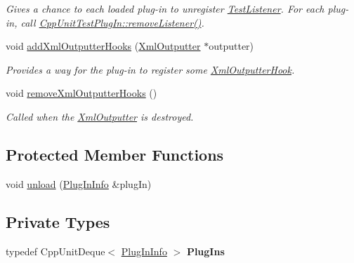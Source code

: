 \begin{DoxyCompactItemize}
\begin{DoxyCompactList}\small\item\em Gives a chance to each loaded plug-\/in to unregister \hyperlink{class_test_listener}{Test\+Listener}. For each plug-\/in, call \hyperlink{struct_cpp_unit_test_plug_in_a8f36157014b515d38efbc8ab67923d85}{Cpp\+Unit\+Test\+Plug\+In\+::remove\+Listener()}. \end{DoxyCompactList}\item 
void \hyperlink{class_plug_in_manager_a4a9c64e0ac3f762b100b993d7e33f889}{add\+Xml\+Outputter\+Hooks} (\hyperlink{class_xml_outputter}{Xml\+Outputter} $\ast$outputter)\hypertarget{class_plug_in_manager_a4a9c64e0ac3f762b100b993d7e33f889}{}\label{class_plug_in_manager_a4a9c64e0ac3f762b100b993d7e33f889}

\begin{DoxyCompactList}\small\item\em Provides a way for the plug-\/in to register some \hyperlink{class_xml_outputter_hook}{Xml\+Outputter\+Hook}. \end{DoxyCompactList}\item 
void \hyperlink{class_plug_in_manager_a0fe59f82fd430ea57159a6ffad9a4035}{remove\+Xml\+Outputter\+Hooks} ()
\begin{DoxyCompactList}\small\item\em Called when the \hyperlink{class_xml_outputter}{Xml\+Outputter} is destroyed. \end{DoxyCompactList}\end{DoxyCompactItemize}
\subsection*{Protected Member Functions}
\begin{DoxyCompactItemize}
\item 
void \hyperlink{class_plug_in_manager_afc1fa045afaac73cd44f69839056f1e1}{unload} (\hyperlink{struct_plug_in_manager_1_1_plug_in_info}{Plug\+In\+Info} \&plug\+In)
\end{DoxyCompactItemize}
\subsection*{Private Types}
\begin{DoxyCompactItemize}
\item 
typedef Cpp\+Unit\+Deque$<$ \hyperlink{struct_plug_in_manager_1_1_plug_in_info}{Plug\+In\+Info} $>$ {\bfseries Plug\+Ins}\hypertarget{class_plug_in_manager_ab387ba1fae9d51e50417942935901ad0}{}\label{class_plug_in_manager_ab387ba1fae9d51e50417942935901ad0}

\end{DoxyCompactItemize}
